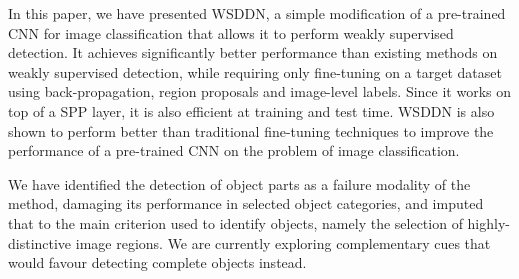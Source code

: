 In this paper, we have presented WSDDN, a simple modification of a pre-trained CNN for image classification that allows it to perform weakly supervised detection. It achieves significantly better performance than existing methods on weakly supervised detection, while requiring only fine-tuning on a target dataset using back-propagation, region proposals and image-level labels. Since it works on top of a SPP layer, it is also efficient at training and test time. WSDDN is also shown to perform better than traditional fine-tuning techniques to improve the performance of a pre-trained CNN on the problem of image classification.

We have identified the detection of object parts as a failure modality of the method, damaging its performance in selected object categories, and imputed that to the main criterion used to identify objects, namely the selection of highly-distinctive image regions. We are currently exploring complementary cues that would favour detecting complete objects instead.
